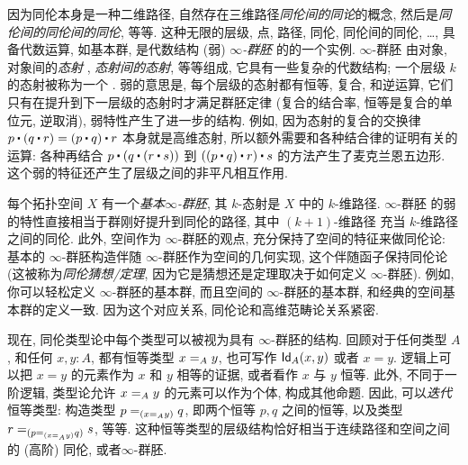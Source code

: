 因为同伦本身是一种二维路径, 自然存在三维路径\emph{同伦间的同论}的概念,
%
然后是\emph{同伦间的同伦间的同伦}, 等等.
这种无限的层级, 点, 路径, 同伦, 同伦间的同伦, \ldots, 具备代数运算, 如基本群, 是代数结构 (弱) \emph{$\infty$-群胚} 的的一个实例.
$\infty$-群胚 由对象, 对象间的\emph{态射}%
, \emph{态射间的态射}, 等等组成, 它具有一些复杂的代数结构;
一个层级 $k$ 的态射被称为一个 .
弱的意思是, 每个层级的态射都有恒等, 复合, 和逆运算, 它们只有在提升到下一层级的态射时才满足群胚定律 (复合的结合率, 恒等是复合的单位元, 逆取消), 弱特性产生了进一步的结构.
例如, 因为态射的复合的交换律 $p \ct (q \ct r) = (p \ct q) \ct r$ 本身就是高维态射, 所以额外需要和各种结合律的证明有关的运算: 各种再结合 $p \ct (q \ct (r \ct s))$ 到 $((p \ct q) \ct r) \ct s$ 的方法产生了麦克兰恩五边形.
这个弱的特征还产生了层级之间的非平凡相互作用.

每个拓扑空间 $X$ 有一个\emph{基本$\infty$-群胚},
%
%
其 $k$-态射是 $X$ 中的 $k$-维路径.
$\infty$-群胚 的弱的特性直接相当于群刚好提升到同伦的路径, 其中 $(k+1)$-维路径 充当 $k$-维路径之间的同伦.
此外, 空间作为 $\infty$-群胚的观点, 充分保持了空间的特征来做同伦论: 基本的 $\infty$-群胚构造伴随 $\infty$-群胚作为空间的几何实现, 这个伴随函子保持同伦论
(这被称为\emph{同伦猜想/定理}, 
%
因为它是猜想还是定理取决于如何定义 $\infty$-群胚).
例如, 你可以轻松定义 $\infty$-群胚的基本群, 而且空间的 $\infty$-群胚的基本群, 和经典的空间基本群的定义一致.
因为这个对应关系, 同伦论和高维范畴论关系紧密.

%
%

\mentalpause

现在, 同伦类型论中每个类型可以被视为具有 $\infty$-群胚的结构.
回顾对于任何类型 $A$, 和任何 $x,y:A$, 都有恒等类型 $\id[A]{x}{y}$, 也可写作 $\idtype[A]{x}{y}$ 或者 $x=y$.
逻辑上可以把 $x=y$ 的元素作为 $x$ 和 $y$ 相等的证据, 或者看作 $x$ 与 $y$ 恒等. 此外, 不同于一阶逻辑, 类型论允许 $\id[A]{x}{y}$ 的元素可以作为个体, 构成其他命题.
因此, 可以\emph{迭代}恒等类型: 构造类型
$\id[{(\id[A]{x}{y})}]{p}{q}$, 即两个恒等 $p,q$ 之间的恒等, 以及类型 $\id[{(\id[{(\id[A]{x}{y})}]{p}{q})}]{r}{s}$, 等等.
这种恒等类型的层级结构恰好相当于连续路径和空间之间的 (高阶) 同伦, 或者$\infty$-群胚.


